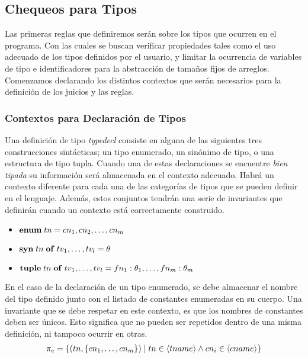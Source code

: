 \subsection{Chequeos para Tipos}

Las primeras reglas que definiremos serán sobre los tipos que ocurren en el programa.
Con las cuales se buscan verificar propiedades tales como el uso adecuado de los tipos definidos por el usuario, y limitar la ocurrencia de variables de tipo e identificadores para la abstracción de tamaños fijos de arreglos.
Comenzamos declarando los distintos contextos que serán necesarios para la definición de los juicios y las reglas.

\subsubsection{Contextos para Declaración de Tipos}

Una definición de tipo \textit{typedecl} consiste en alguna de las siguientes tres construcciones sintácticas; un tipo enumerado, un sinónimo de tipo, o una estructura de tipo tupla.
Cuando una de estas declaraciones se encuentre \textit{bien tipada} su información será almacenada en el contexto adecuado.
Habrá un contexto diferente para cada una de las categorías de tipos que se pueden definir en el lenguaje.
Además, estos conjuntos tendrán una serie de invariantes que definirán cuando un contexto está correctamente construido.

\begin{itemize}
    \item $\mathbf{enum} \; tn = cn_1, cn_2, \ldots, cn_m$
    \item $\mathbf{syn} \; tn \; \mathbf{of} \; tv_1, \ldots, tv_l = \theta$
    \item $\mathbf{tuple} \; tn \; \mathbf{of} \; tv_1, \ldots, tv_l = fn_1 : \theta_1, \ldots, fn_m : \theta_m$
\end{itemize}

En el caso de la declaración de un tipo enumerado, se debe almacenar el nombre del tipo definido junto con el listado de constantes enumeradas en su cuerpo.
Una invariante que se debe respetar en este contexto, es que los nombres de constantes deben ser únicos.
Esto significa que no pueden ser repetidos dentro de una misma definición, ni tampoco ocurrir en otras.
\begin{gather*}
\pi_{e} =
\{ 
(tn, \{ cn_1, \ldots, cn_m \} ) \mid 
tn \in \langle tname \rangle 
\wedge 
cn_i \in \langle cname \rangle
\}
\end{gather*}

